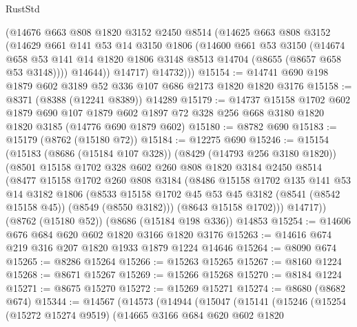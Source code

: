 \begin{lexlean}{RustStd}
\begin{coremodule}
          (@14676
            @663
            @808
            @1820
            @3152
            @2450
            @8514
            (@14625
              @663
              @808
              @3152
              (@14629
                @661
                @141
                @53
                @14
                @3150
                @1806
                (@14600
                  @661
                  @53
                  @3150
                  (@14674
                    @658
                    @53
                    @141
                    @14
                    @1820
                    @1806
                    @3148
                    @8513
                    @14704
                    (@8655 (@8657 @658 @53 @3148))))
                @14644))
            @14717)
          @14732)))
@15154 := @14741 @690 @198 @1879 @602 @3189 @52 @336 @107 @686 @2173 @1820 @1820 @3176
@15158 := @8371 (@8388 (@12241 @8389)) @14289
@15179 := @14737
    @15158
    @1702
    @602
    @1879
    @690
    @107
    @1879
    @602
    @1897
    @72
    @328
    @256
    @668
    @3180
    @1820
    @1820
    @3185
    (@14776 @690 @1879 @602)
@15180 := @8782 @690
@15183 := @15179 (@8762 (@15180 @72))
@15184 := @12275 @690
@15246 := @15154
    (@15183
      (@8686 (@15184 @107 @328))
      (@8429 (@14793 @256 @3180 @1820))
      (@8501
        @15158
        @1702
        @328
        @602
        @260
        @808
        @1820
        @3184
        @2450
        @8514
        (@8477
          @15158
          @1702
          @260
          @808
          @3184
          (@8486
            @15158
            @1702
            @135
            @141
            @53
            @14
            @3182
            @1806
            (@8533 @15158 @1702 @45 @53 @45 @3182 (@8541 (@8542 @15158 @45)) (@8549 (@8550 @3182)))
            (@8643 @15158 @1702)))
        @14717))
    (@8762 (@15180 @52))
    (@8686 (@15184 @198 @336))
    @14853
@15254 := @14606 @676 @684 @620 @602 @1820 @3166 @1820 @3176
@15263 := @14616 @674 @219 @316 @207 @1820 @1933 @1879 @1224 @14646
@15264 := @8090 @674
@15265 := @8286 @15264
@15266 := @15263 @15265
@15267 := @8160 @1224
@15268 := @8671 @15267
@15269 := @15266 @15268
@15270 := @8184 @1224
@15271 := @8675 @15270
@15272 := @15269 @15271
@15274 := @8680 (@8682 @674)
@15344 := @14567
    (@14573
      (@14944
        (@15047
          (@15141
            (@15246
              (@15254
                (@15272 @15274 @9519)
                (@14665
                  @3166
                  @684
                  @620
                  @602
                  @1820

\end{coremodule}
\end{lexlean}
